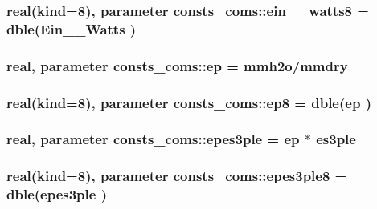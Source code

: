 \subsubsection[{\texorpdfstring{ein\+\_\+2\+\_\+watts8}{ein_2_watts8}}]{\setlength{\rightskip}{0pt plus 5cm}real(kind=8), parameter consts\+\_\+coms\+::ein\+\_\+\_\+watts8 = dble(Ein\+\_\+\_\+\+Watts )}\hypertarget{namespaceconsts__coms_ad0b693d469a9252c873f9c2589d2dda9}{}\label{namespaceconsts__coms_ad0b693d469a9252c873f9c2589d2dda9}
\subsubsection[{\texorpdfstring{ep}{ep}}]{\setlength{\rightskip}{0pt plus 5cm}real, parameter consts\+\_\+coms\+::ep = {\bf mmh2o}/{\bf mmdry}}\hypertarget{namespaceconsts__coms_a7c4e3129334941133aea2f4408d79a4c}{}\label{namespaceconsts__coms_a7c4e3129334941133aea2f4408d79a4c}
\subsubsection[{\texorpdfstring{ep8}{ep8}}]{\setlength{\rightskip}{0pt plus 5cm}real(kind=8), parameter consts\+\_\+coms\+::ep8 = dble({\bf ep} )}\hypertarget{namespaceconsts__coms_ae3bc0b10058a229de8516c83c216041b}{}\label{namespaceconsts__coms_ae3bc0b10058a229de8516c83c216041b}
\subsubsection[{\texorpdfstring{epes3ple}{epes3ple}}]{\setlength{\rightskip}{0pt plus 5cm}real, parameter consts\+\_\+coms\+::epes3ple = {\bf ep} $\ast$ {\bf es3ple}}\hypertarget{namespaceconsts__coms_a12ac1017d17262aa7e40fa9a325273b9}{}\label{namespaceconsts__coms_a12ac1017d17262aa7e40fa9a325273b9}
\subsubsection[{\texorpdfstring{epes3ple8}{epes3ple8}}]{\setlength{\rightskip}{0pt plus 5cm}real(kind=8), parameter consts\+\_\+coms\+::epes3ple8 = dble({\bf epes3ple} )}\hypertarget{namespaceconsts__coms_aab17990b5af5fd6746fc4465af9394ba}{}\label{namespaceconsts__coms_aab17990b5af5fd6746fc4465af9394ba}

